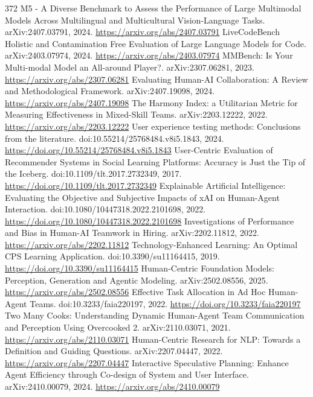 \documentclass[11pt]{article}
\begin{document}
\begin{thebibliography}{372}
 M5 - A Diverse Benchmark to Assess the Performance of Large Multimodal Models Across Multilingual and Multicultural Vision-Language Tasks. arXiv:2407.03791, 2024. \url{https://arxiv.org/abs/2407.03791}
 LiveCodeBench Holistic and Contamination Free Evaluation of Large Language Models for Code. arXiv:2403.07974, 2024. \url{https://arxiv.org/abs/2403.07974}
 MMBench: Is Your Multi-modal Model an All-around Player?. arXiv:2307.06281, 2023. \url{https://arxiv.org/abs/2307.06281}
 Evaluating Human-AI Collaboration: A Review and Methodological Framework. arXiv:2407.19098, 2024. \url{https://arxiv.org/abs/2407.19098}
 The Harmony Index: a Utilitarian Metric for Measuring Effectiveness in Mixed-Skill Teams. arXiv:2203.12222, 2022. \url{https://arxiv.org/abs/2203.12222}
 User experience testing methods: Conclusions from the literature. doi:10.55214/25768484.v8i5.1843, 2024. \url{https://doi.org/10.55214/25768484.v8i5.1843}
 User-Centric Evaluation of Recommender Systems in Social Learning Platforms: Accuracy is Just the Tip of the Iceberg. doi:10.1109/tlt.2017.2732349, 2017. \url{https://doi.org/10.1109/tlt.2017.2732349}
 Explainable Artificial Intelligence: Evaluating the Objective and Subjective Impacts of xAI on Human-Agent Interaction. doi:10.1080/10447318.2022.2101698, 2022. \url{https://doi.org/10.1080/10447318.2022.2101698}
 Investigations of Performance and Bias in Human-AI Teamwork in Hiring. arXiv:2202.11812, 2022. \url{https://arxiv.org/abs/2202.11812}
 Technology-Enhanced Learning: An Optimal CPS Learning Application. doi:10.3390/su11164415, 2019. \url{https://doi.org/10.3390/su11164415}
 Human-Centric Foundation Models: Perception, Generation and Agentic Modeling. arXiv:2502.08556, 2025. \url{https://arxiv.org/abs/2502.08556}
 Effective Task Allocation in Ad Hoc Human-Agent Teams. doi:10.3233/faia220197, 2022. \url{https://doi.org/10.3233/faia220197}
 Two Many Cooks: Understanding Dynamic Human-Agent Team Communication and Perception Using Overcooked 2. arXiv:2110.03071, 2021. \url{https://arxiv.org/abs/2110.03071}
 Human-Centric Research for NLP: Towards a Definition and Guiding Questions. arXiv:2207.04447, 2022. \url{https://arxiv.org/abs/2207.04447}
 Interactive Speculative Planning: Enhance Agent Efficiency through Co-design of System and User Interface. arXiv:2410.00079, 2024. \url{https://arxiv.org/abs/2410.00079}

\end{thebibliography}
\end{document}
